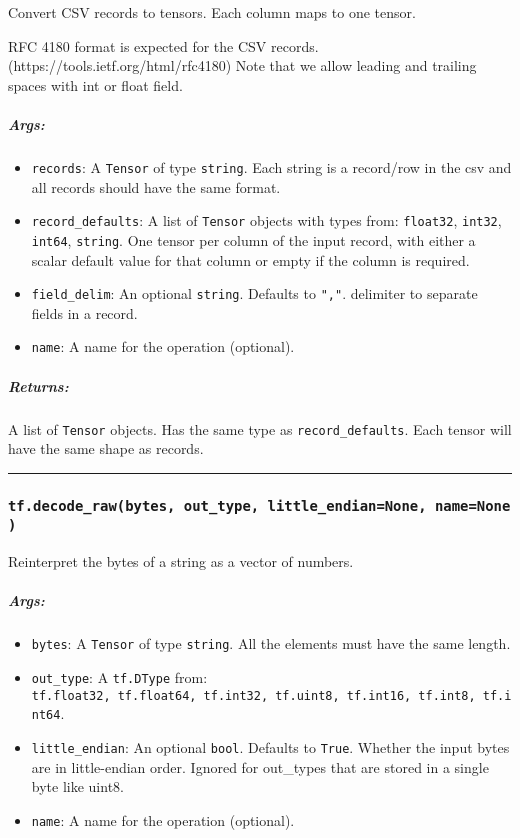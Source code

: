 Convert CSV records to tensors. Each column maps to one tensor.

RFC 4180 format is expected for the CSV records.
(https://tools.ietf.org/html/rfc4180) Note that we allow leading and
trailing spaces with int or float field.

\subparagraph{Args: }\label{args-43}

\begin{itemize}
\tightlist
\item
  \texttt{records}: A \texttt{Tensor} of type \texttt{string}. Each
  string is a record/row in the csv and all records should have the same
  format.
\item
  \texttt{record\_defaults}: A list of \texttt{Tensor} objects with
  types from: \texttt{float32}, \texttt{int32}, \texttt{int64},
  \texttt{string}. One tensor per column of the input record, with
  either a scalar default value for that column or empty if the column
  is required.
\item
  \texttt{field\_delim}: An optional \texttt{string}. Defaults to
  \texttt{","}. delimiter to separate fields in a record.
\item
  \texttt{name}: A name for the operation (optional).
\end{itemize}

\subparagraph{Returns: }\label{returns-37}

A list of \texttt{Tensor} objects. Has the same type as
\texttt{record\_defaults}. Each tensor will have the same shape as
records.

\begin{center}\rule{0.5\linewidth}{\linethickness}\end{center}

\subsubsection{\texorpdfstring{\texttt{tf.decode\_raw(bytes,\ out\_type,\ little\_endian=None,\ name=None)}
}{tf.decode\_raw(bytes, out\_type, little\_endian=None, name=None) }}\label{tf.decodeux5frawbytes-outux5ftype-littleux5fendiannone-namenone}

Reinterpret the bytes of a string as a vector of numbers.

\subparagraph{Args: }\label{args-44}

\begin{itemize}
\tightlist
\item
  \texttt{bytes}: A \texttt{Tensor} of type \texttt{string}. All the
  elements must have the same length.
\item
  \texttt{out\_type}: A \texttt{tf.DType} from:
  \texttt{tf.float32,\ tf.float64,\ tf.int32,\ tf.uint8,\ tf.int16,\ tf.int8,\ tf.int64}.
\item
  \texttt{little\_endian}: An optional \texttt{bool}. Defaults to
  \texttt{True}. Whether the input bytes are in little-endian order.
  Ignored for out\_types that are stored in a single byte like uint8.
\item
  \texttt{name}: A name for the operation (optional).
\end{itemize}

